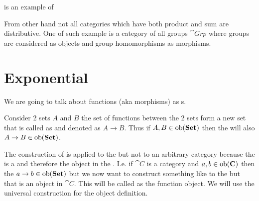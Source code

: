 \begin{example}
\label{ex:distributive_category}
 is an example 
\cite{wiki:distributive_category}
of 

From other hand not all categories which have both product and sum are
distributive. One of such example is a category of all groups
\cite{wiki:distributive_category} 
$\cat{Grp}$ where groups are considered as objects and group
homomorphisms as morphisms. 
\end{example}

\section{Exponential}
We are going to talk about functions (aka morphisms) as
s. 

\begin{example}[Homset]
\label{ex:homset}
Consider 2 sets $A$ and $B$ the set of functions between the 2 sets
form a new set that is called as  and denoted as $A
\to B$. Thus if $A,B \in \mathrm{ob}(\mathbf{Set})$ then the  will also $A
\to B \in \mathrm{ob}(\mathbf{Set})$. 
\end{example}

The construction of  is applied to
the  but not to an arbitrary category because
the  is a  and therefore the
object in the . I.e. if $\cat{C}$ is a
category and $a, b \in \mathrm{ob}(\mathbf{C})$ 
then the  $a \to b \in \mathrm{ob}(\mathbf{Set})$ but we now want to
construct something like to the  but that is an object in
$\cat{C}$. This will be called as the function object. We will use the
universal construction for the object definition.

